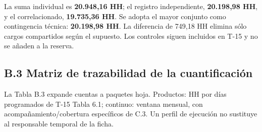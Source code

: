 La suma individual es \textbf{20.948,16 HH}; el registro independiente, \textbf{20.198,98 HH}, y el correlacionado, \textbf{19.735,36 HH}. Se adopta el mayor conjunto como contingencia técnica: \textbf{20.198,98 HH}. La diferencia de 749,18 HH elimina sólo cargos compartidos según el supuesto. Los controles siguen incluidos en T-15 y no se añaden a la reserva.

\subsection*{B.3 Matriz de trazabilidad de la cuantificación}

La Tabla B.3 expande cuentas a paquetes hoja. Productos: HH por días programados de T-15 Tabla 6.1; continuo: ventana mensual, con acompañamiento/cobertura específicos de C.3. Un perfil de ejecución no sustituye al responsable temporal de la ficha.

